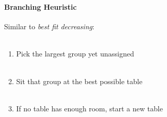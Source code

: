 \documentclass{beamer}
\newcommand{\AutoSectionTitle}{}
\begin{document}


\begin{frame}
  \frametitle{\AutoSectionTitle}
  \begin{center}
    
  \end{center}
\end{frame}




\begin{frame}
  \frametitle{\AutoSectionTitle}
  \framesubtitle{Branching Heuristic}
  Similar to \emph{best fit decreasing}: \\~\\
  \pause
  \begin{enumerate}
  \item Pick the largest group yet unassigned \\~\\
    \pause
  \item Sit that group at the best possible table \\~\\
    \pause
  \item If no table has enough room, start a new table
  \end{enumerate}
\end{frame}


\end{document}
